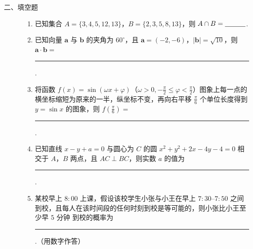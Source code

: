 \begin{description}

    \item[二、填空题]

    \begin{enumerate}[leftmargin=5pt]

      \addtocounter{enumi}{+10}

        \item 已知集合 \(A = \{3, 4, 5, 12, 13\}\)，\(B = \{2, 3, 5, 8, 13\}\)，则 \(A \cap B =\rule[-0.3ex]{3em}{0.4pt}\).

        \item 已知向量 \(\bm{a}\) 与 \(\bm{b}\) 的夹角为 \( 60^{\circ} \)，且 \(\bm{a} = (-2, -6)\)，\(|\bm{b}| = \sqrt{10}\)，则 \(\bm{a} \cdot \bm{b} =\)\rule[-0.3ex]{3em}{0.4pt}.

        \item 将函数 \( f(x) = \sin (\omega x + \varphi) \)（\(\omega > 0, -\frac{\pi}{2} \leqslant \varphi < \frac{\pi}{2}\)）图象上每一点的横坐标缩短为原来的一半，纵坐标不变，再向右平移 \(\frac{\pi}{6}\) 个单位长度得到 \( y = \sin x \) 的图象，则 \( f\left(\frac{\pi}{6}\right) = \)\rule[-0.3ex]{3em}{0.4pt}.

        \item 已知直线 \(x - y + a = 0\) 与圆心为 \(C\) 的圆 \(x^{2} + y^{2} + 2x - 4y - 4 = 0\) 相交于 \(A\)，\(B\) 两点，且 \(AC \perp BC\)，则实数 \(a\) 的值为\rule[-0.3ex]{3em}{0.4pt}.

        \item 某校早上 \(8{:}00\) 上课，假设该校学生小张与小王在早上 \(7{:}30\text{--}7{:}50\) 之间到校，且每人在该时间段的任何时刻到校是等可能的，则小张比小王至少早 \(5\text{ 分钟}\) 到校的概率为\rule[-0.3ex]{3em}{0.4pt}.（用数字作答）

    \end{enumerate}

\end{description}


